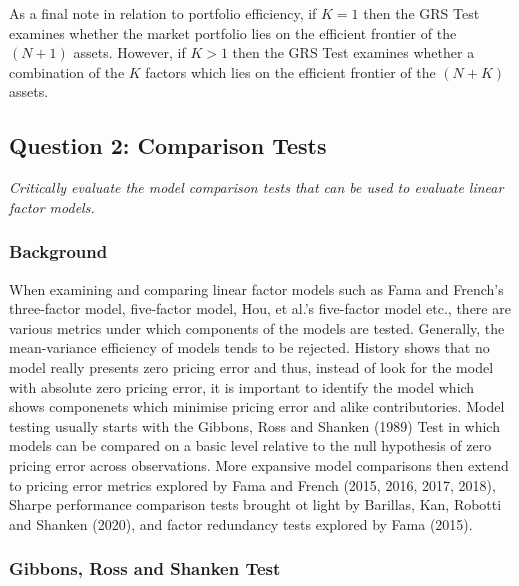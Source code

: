 \documentclass[11pt, english]{article}
\begin{document}
	As a final note in relation to portfolio efficiency, if $K=1$ then the GRS Test examines whether the market portfolio lies on the efficient frontier of the $(N+1)$ assets. However, if $K>1$ then the GRS Test examines whether a combination of the $K$ factors which lies on the efficient frontier of the $(N+K)$ assets.

	\newpage

	\subsection{Question 2: Comparison Tests}

	\textit{Critically evaluate the model comparison tests that can be used to evaluate linear factor models.}

		\subsubsection*{Background}

	When examining and comparing linear factor models such as Fama and French's three-factor model, five-factor model, Hou, et al.'s five-factor model etc., there are various metrics under which components of the models are tested. Generally, the mean-variance efficiency of models tends to be rejected. History shows that no model really presents zero pricing error and thus, instead of look for the model with absolute zero pricing error, it is important to identify the model which shows componenets which minimise pricing error and alike contributories. Model testing usually starts with the Gibbons, Ross and Shanken (1989) Test in which models can be compared on a basic level relative to the null hypothesis of zero pricing error across observations. More expansive model comparisons then extend to pricing error metrics explored by Fama and French (2015, 2016, 2017, 2018), Sharpe performance comparison tests brought ot light by Barillas, Kan, Robotti and Shanken (2020), and factor redundancy tests explored by Fama (2015).

		\subsubsection*{Gibbons, Ross and Shanken Test}
\end{document}
